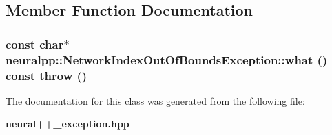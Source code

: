 \subsection{Member Function Documentation}
\subsubsection[what]{\setlength{\rightskip}{0pt plus 5cm}const char$\ast$ neuralpp::NetworkIndexOutOfBoundsException::what () const  throw ()\hspace{0.3cm}{\tt  [inline]}}\label{classneuralpp_1_1NetworkIndexOutOfBoundsException_8b65d77cb375a0aa40d5a9ea692bd5c3}




The documentation for this class was generated from the following file:\begin{CompactItemize}
\item 
{\bf neural++\_\-exception.hpp}\end{CompactItemize}
